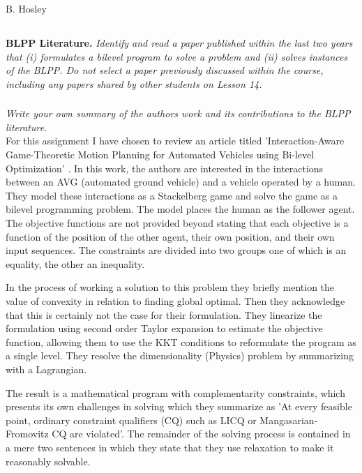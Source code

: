 \documentclass[12pt]{amsart}
\begin{document}
\raggedbottom

\hspace{\fill} {\large B. Hosley}
\bigskip


\setcounter{subsection}{0}
\subsection{}

\textbf{BLPP Literature.} 
\textit{Identify and read a paper published within the last two years that (i) formulates a bilevel program to solve a problem and (ii) solves instances of the BLPP. Do not select a paper previously discussed within the course, including any papers shared by other students on Lesson 14.}

\subsubsection{}
\textit{Write your own summary of the authors work and its contributions to the BLPP literature.} \\

For this assignment I have chosen to review an article titled 'Interaction-Aware Game-Theoretic Motion Planning for 
Automated Vehicles using Bi-level Optimization' \cite{cite:art}. In this work, 
the authors are interested in the interactions between an AVG (automated ground vehicle) and a vehicle operated by a human.
They model these interactions as a Stackelberg game and solve the game as a bilevel programming problem.
The model places the human as the follower agent.
The objective functions are not provided beyond stating that each objective is a function of the position of the other agent, 
their own position, and their own input sequences.
The constraints are divided into two groups one of which is an equality, the other an inequality.


In the process of working a solution to this problem they briefly mention the value of 
convexity in relation to finding global optimal.
Then they acknowledge that this is certainly not the case for their formulation.
They linearize the formulation using second order Taylor expansion to estimate the objective function,
allowing them to use the KKT conditions to reformulate the program as a single level.
They resolve the dimensionality (Physics) problem by summarizing with a Lagrangian.

The result is a mathematical program with complementarity constraints, 
which presents its own challenges in solving which they summarize as 
'At every feasible point, ordinary constraint qualifiers (CQ) such as LICQ or Mangasarian-Fromovitz CQ are violated'.
The remainder of the solving process is contained in a mere two sentences in which they state that they 
use relaxation to make it reasonably solvable. \\
\end{document}
